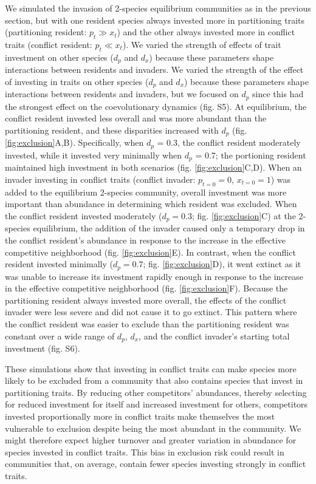 We simulated the invasion of 2-species equilibrium communities as in the
previous section, but with one resident species always invested more in
partitioning traits (partitioning resident: $p_t \gg x_t$) and the other 
always invested more in conflict traits (conflict resident: $p_t \ll x_t$). 
We varied the strength of effects of
trait investment on other species ($d_{p}$ and $d_{x}$) because
these parameters shape interactions between residents and invaders.
We varied the strength of the effect of investing in traits on other species
($d_{p}$ and $d_{x}$) because these parameters shape interactions between
residents and invaders, but we focused on $d_p$ since this had the strongest
effect on the coevolutionary dynamics (fig. S5). 
At equilibrium, the conflict resident invested less overall and was more
abundant than the partitioning resident, and these disparities increased with
$d_p$ (fig. \ref{fig:exclusion}A,B). Specifically, when $d_p$ = 0.3, the
conflict resident moderately invested, while it invested very minimally when
$d_p$ = 0.7; the portioning resident maintained high investment in both
scenarios (fig. \ref{fig:exclusion}C,D). When an invader investing in conflict
traits (conflict invader: $p_{t=0} = 0$, $x_{t=0} = 1$) was added to the
equilibrium 2-species community, overall investment was more important than
abundance in determining which resident was excluded.
When the conflict resident invested moderately ($d_p=0.3$;
fig. \ref{fig:exclusion}C) at the 2-species equilibrium, the addition of the
invader caused only a temporary drop in the conflict resident’s abundance in
response to the increase in the effective competitive neighborhood (fig.
\ref{fig:exclusion}E). In contrast, when the conflict resident invested
minimally ($d_p=0.7$; fig. \ref{fig:exclusion}D), it went extinct as it was
unable to increase its investment rapidly enough in response to the increase in
the effective competitive neighborhood (fig. \ref{fig:exclusion}F).
Because the partitioning resident always
invested more overall, the effects of the conflict invader were less
severe and did not cause it to go extinct. This pattern where the
conflict resident was easier to exclude than the partitioning resident
was constant over a wide range of $d_{p}$, $d_{x}$, and the conflict
invader's starting total investment (fig. S6).


These simulations show that investing in conflict traits can make
species more likely to be excluded from a community that also contains
species that invest in partitioning traits. By reducing other
competitors' abundances, thereby selecting for reduced investment for
itself and increased investment for others, competitors invested
proportionally more in conflict traits make themselves the most vulnerable to
exclusion despite being the most abundant in the community. We might
therefore expect higher turnover and greater variation in abundance for
species invested in conflict traits. This bias in exclusion risk could
result in communities that, on average, contain fewer species investing
strongly in conflict traits.

